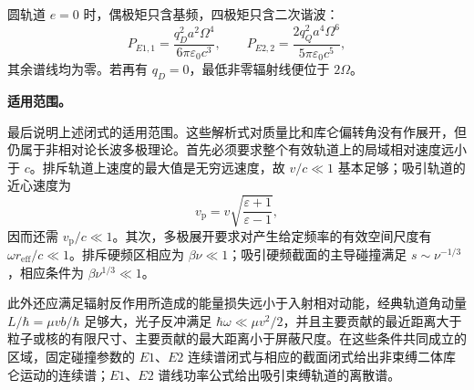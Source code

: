 圆轨道 $e=0$ 时，偶极矩只含基频，四极矩只含二次谐波：
\begin{equation*}
	P_{E1,1}=\frac{q_D^2a^2\Omega^4}{6\pi\varepsilon_0c^3},
	\qquad
	P_{E2,2}=\frac{2q_Q^2a^4\Omega^6}{5\pi\varepsilon_0c^5},
\end{equation*}
其余谱线均为零。若再有 $q_D=0$，最低非零辐射线便位于 $2\Omega$。

\textbf{适用范围。}

最后说明上述闭式的适用范围。这些解析式对质量比和库仑偏转角没有作展开，但仍属于非相对论长波多极理论。首先必须要求整个有效轨道上的局域相对速度远小于 $c$。排斥轨道上速度的最大值是无穷远速度，故 $v/c\ll1$ 基本足够；吸引轨道的近心速度为
\begin{equation*}
	v_{\mathrm p}=v\sqrt{\frac{\varepsilon+1}{\varepsilon-1}},
\end{equation*}
因而还需 $v_{\mathrm p}/c\ll1$。其次，多极展开要求对产生给定频率的有效空间尺度有 $\omega r_{\mathrm{eff}}/c\ll1$。排斥硬频区相应为 $\beta\nu\ll1$；吸引硬频截面的主导碰撞满足 $s\sim\nu^{-1/3}$，相应条件为 $\beta\nu^{1/3}\ll1$。

此外还应满足辐射反作用所造成的能量损失远小于入射相对动能，经典轨道角动量 $L/\hbar=\mu vb/\hbar$ 足够大，光子反冲满足 $\hbar\omega\ll\mu v^2/2$，并且主要贡献的最近距离大于粒子或核的有限尺寸、主要贡献的最大距离小于屏蔽尺度。在这些条件共同成立的区域，固定碰撞参数的 $E1$、$E2$ 连续谱闭式与相应的截面闭式给出非束缚二体库仑运动的连续谱；$E1$、$E2$ 谱线功率公式给出吸引束缚轨道的离散谱。

